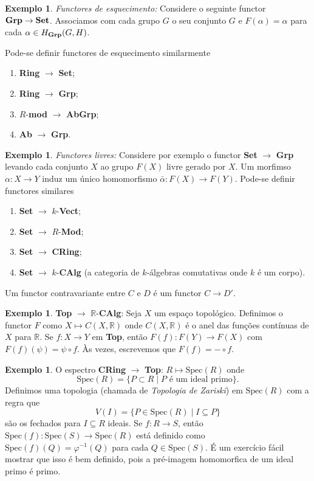 \documentclass[12pt]{amsart}
\theoremstyle{definition}
\newtheorem{example}[theorem]{Exemplo}
\begin{document}
\begin{example}
\emph{Functores de esquecimento:} Considere o seguinte functor ${\bf Grp} \to {\bf Set}$. Associamos com cada grupo $G$ o seu conjunto 
$G$ e $F(\alpha)=\alpha$ para cada $\alpha\in H_{\bf Grp}(G,H)$. 

Pode-se definir functores de esquecimento similarmente 
\begin{enumerate}
    \item {\bf Ring} $\to$ {\bf Set}; 
    \item {\bf Ring} $\to$ {\bf Grp}; 
    \item $R$-{\bf mod} $\to$ {\bf AbGrp}; 
    \item {\bf Ab} $\to$ {\bf Grp}.
\end{enumerate}
\end{example}

\begin{example}
\emph{Functores livres:} Considere por exemplo o functor {\bf Set} $\to$ {\bf Grp} levando cada conjunto $X$ ao grupo 
$F(X)$ livre gerado por $X$. Um morfimso $\alpha:X\to Y$ induz um único homomorfismo $\bar \alpha:F(X)\to F(Y)$. 
Pode-se definir functores similares 
\begin{enumerate}
\item {\bf Set} $\to$ $k$-{\bf Vect}; 
\item {\bf Set} $\to$ $R$-{\bf Mod}; 
\item {\bf Set} $\to$ {\bf CRing};
\item {\bf Set} $\to$ $k$-{\bf CAlg} (a categoria de $k$-álgebras comutativas onde $k$ é um corpo).
\end{enumerate} 
\end{example}

Um functor contravariante entre $C$ e $D$ é um functor $C \to D'$.

\begin{example}
{\bf Top} $\to$ $\mathbb R$-{\bf CAlg}: Seja $X$ um espaço topológico. Definimos o functor $F$ 
como $X\mapsto C(X,\mathbb R)$ onde $C(X,\mathbb R)$ é o anel das funções contínuas de $X$ para $\mathbb R$. Se $f: X\to Y$ em {\bf Top}, então $F(f): F(Y)\to F(X)$ com $F(f)(\psi)=\psi\circ f$. Às vezes, escrevemos que 
$F(f)=-\circ f$.
\end{example}

\begin{example}
O espectro {\bf CRing}  $\to$  {\bf Top}: $R\mapsto \mbox{Spec}(R)$ onde 
\[ 
    \mbox{Spec}(R)=\{P\subset R\mid P \mbox{ é um ideal primo}\}.
\]
Definimos uma topologia (chamada de \emph{Topologia de Zariski}) em $\mbox{Spec}(R)$ com a regra que 
$$ 
V(I) =\{P\in\mbox{Spec}(R)\mid I\subseteq P\}
$$
são os fechados para $I\subseteq R$ ideais. Se $f:R\to S$, então $\mbox{Spec}(f):\mbox{Spec}(S)\to \mbox{Spec}(R)$ está definido como $\mbox{Spec}(f)(Q)=\varphi^{-1}(Q)$ para cada $Q\in \mbox{Spec}(S)$. É um exercício fácil 
mostrar que isso é bem definido, pois a pré-imagem homomorfica de um ideal primo é primo.
\end{example}
\end{document}

